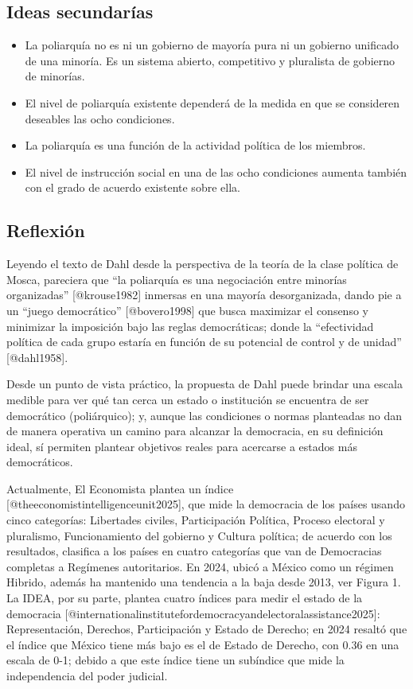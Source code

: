 \documentclass[
  letterpaper,
  DIV=11,
  numbers=noendperiod]{scrartcl}
\begin{document}
\subsection{Ideas secundarías}\label{ideas-secundaruxedas}

\begin{itemize}
\item
  La poliarquía no es ni un gobierno de mayoría pura ni un gobierno
  unificado de una minoría. Es un sistema abierto, competitivo y
  pluralista de gobierno de minorías.
\item
  El nivel de poliarquía existente dependerá de la medida en que se
  consideren deseables las ocho condiciones.
\item
  La poliarquía es una función de la actividad política de los miembros.
\item
  El nivel de instrucción social en una de las ocho condiciones aumenta
  también con el grado de acuerdo existente sobre ella.
\end{itemize}

\subsection{Reflexión}\label{reflexiuxf3n}

Leyendo el texto de Dahl desde la perspectiva de la teoría de la clase
política de Mosca, pareciera que ``la poliarquía es una negociación
entre minorías organizadas'' {[}@krouse1982{]} inmersas en una mayoría
desorganizada, dando pie a un ``juego democrático'' {[}@bovero1998{]}
que busca maximizar el consenso y minimizar la imposición bajo las
reglas democráticas; donde la ``efectividad política de cada grupo
estaría en función de su potencial de control y de unidad''
{[}@dahl1958{]}.

Desde un punto de vista práctico, la propuesta de Dahl puede brindar una
escala medible para ver qué tan cerca un estado o institución se
encuentra de ser democrático (poliárquico); y, aunque las condiciones o
normas planteadas no dan de manera operativa un camino para alcanzar la
democracia, en su definición ideal, sí permiten plantear objetivos
reales para acercarse a estados más democráticos.

Actualmente, El Economista plantea un índice
{[}@theeconomistintelligenceunit2025{]}, que mide la democracia de los
países usando cinco categorías: Libertades civiles, Participación
Política, Proceso electoral y pluralismo, Funcionamiento del gobierno y
Cultura política; de acuerdo con los resultados, clasifica a los países
en cuatro categorías que van de Democracias completas a Regímenes
autoritarios. En 2024, ubicó a México como un régimen Hibrido, además ha
mantenido una tendencia a la baja desde 2013, ver Figura 1. La IDEA, por
su parte, plantea cuatro índices para medir el estado de la democracia
{[}@internationalinstitutefordemocracyandelectoralassistance2025{]}:
Representación, Derechos, Participación y Estado de Derecho; en 2024
resaltó que el índice que México tiene más bajo es el de Estado de
Derecho, con 0.36 en una escala de 0-1; debido a que este índice tiene
un subíndice que mide la independencia del poder judicial.
\end{document}
